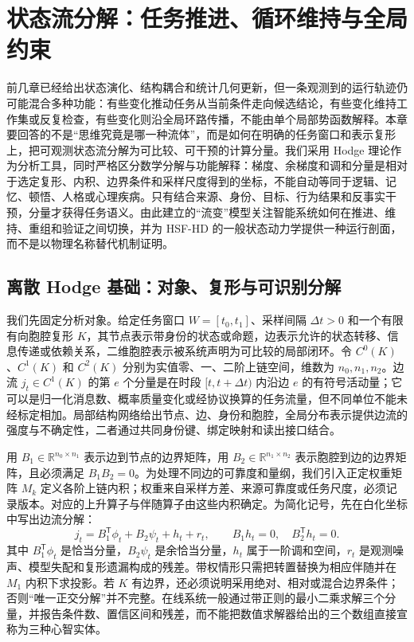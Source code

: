 \chapter{状态流分解：任务推进、循环维持与全局约束}
\label{chp:rheological_ch}

前几章已经给出状态演化、结构耦合和统计几何更新，但一条观测到的运行轨迹仍可能混合多种功能：有些变化推动任务从当前条件走向候选结论，有些变化维持工作集或反复检查，有些变化则沿全局环路传播，不能由单个局部势函数解释。本章要回答的不是“思维究竟是哪一种流体”，而是如何在明确的任务窗口和表示复形上，把可观测状态流分解为可比较、可干预的计算分量。我们采用 Hodge 理论作为分析工具，同时严格区分数学分解与功能解释：梯度、余梯度和调和分量是相对于选定复形、内积、边界条件和采样尺度得到的坐标，不能自动等同于逻辑、记忆、顿悟、人格或心理疾病。只有结合来源、身份、目标、行为结果和反事实干预，分量才获得任务语义。由此建立的“流变”模型关注智能系统如何在推进、维持、重组和验证之间切换，并为 HSF-HD 的一般状态动力学提供一种运行剖面，而不是以物理名称替代机制证明。

\section{离散 Hodge 基础：对象、复形与可识别分解}
\label{sec:covariant_hodge_basis}

我们先固定分析对象。给定任务窗口 $W=[t_0,t_1]$、采样间隔 $\Delta t>0$ 和一个有限有向胞腔复形 $K$，其节点表示带身份的状态或命题，边表示允许的状态转移、信息传递或依赖关系，二维胞腔表示被系统声明为可比较的局部闭环。令 $C^0(K)$、$C^1(K)$ 和 $C^2(K)$ 分别为实值零、一、二阶上链空间，维数为 $n_0,n_1,n_2$。边流 $j_t\in C^1(K)$ 的第 $e$ 个分量是在时段 $[t,t+\Delta t)$ 内沿边 $e$ 的有符号活动量；它可以是归一化消息数、概率质量变化或经协议换算的任务流量，但不同单位不能未经标定相加。局部结构网络给出节点、边、身份和胞腔，全局分布表示提供边流的强度与不确定性，二者通过共同身份键、绑定映射和读出接口结合。

用 $B_1\in\mathbb{R}^{n_0\times n_1}$ 表示边到节点的边界矩阵，用 $B_2\in\mathbb{R}^{n_1\times n_2}$ 表示胞腔到边的边界矩阵，且必须满足 $B_1B_2=0$。为处理不同边的可靠度和量纲，我们引入正定权重矩阵 $M_k$ 定义各阶上链内积；权重来自采样方差、来源可靠度或任务尺度，必须记录版本。对应的上升算子与伴随算子由这些内积确定。为简化记号，先在白化坐标中写出边流分解：
\begin{equation}
  j_t=B_1^{\mathsf T}\phi_t+B_2\psi_t+h_t+r_t,
  \qquad B_1h_t=0,\quad B_2^{\mathsf T}h_t=0 .
  \label{eq:rheology_hodge_decomposition}
\end{equation}
其中 $B_1^{\mathsf T}\phi_t$ 是恰当分量，$B_2\psi_t$ 是余恰当分量，$h_t$ 属于一阶调和空间，$r_t$ 是观测噪声、模型失配和复形遗漏构成的残差。带权情形只需把转置替换为相应伴随并在 $M_1$ 内积下求投影。若 $K$ 有边界，还必须说明采用绝对、相对或混合边界条件；否则“唯一正交分解”并不完整。在线系统一般通过带正则的最小二乘求解三个分量，并报告条件数、置信区间和残差，而不能把数值求解器给出的三个数组直接宣称为三种心智实体。

